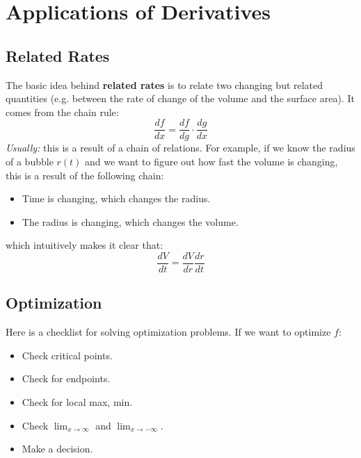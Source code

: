 \documentclass{article}
\let\oldtextbf\textbf
\renewcommand{\textbf}[1]{\oldtextbf{#1}\index{#1}}
\begin{document}
\section{Applications of Derivatives}
\subsection{Related Rates}
The basic idea behind \textbf{related rates} is to relate two changing but related quantities (e.g. between the rate of change of the volume and the surface area). It comes from the chain rule:
    \begin{equation}
        \frac{df}{dx}=\frac{df}{dg} \cdot \frac{dg}{dx}
        \label{eq:}
    \end{equation}
\textit{Usually:} this is a result of a chain of relations. For example, if we know the radius of a bubble $r(t)$ and we want to figure out how fast the volume is changing, this is a result of the following chain:
    \begin{itemize}
        \item Time is changing, which changes the radius.
        \item The radius is changing, which changes the volume.
    \end{itemize}
    which intuitively makes it clear that:
    \begin{equation}
        \frac{dV}{dt} = \frac{dV}{dr} \frac{dr}{dt}
        \label{eq:}
    \end{equation}
\subsection{Optimization}
Here is a checklist for solving optimization problems. If we want to optimize $f$:
\begin{itemize}
    \item Check critical points.
    \item Check for endpoints.
    \item Check for local max, min.
    \item Check $\lim_{x\to \infty}$ and $\lim_{x\to -\infty}$.
    \item Make a decision.
\end{itemize}
\end{document}
